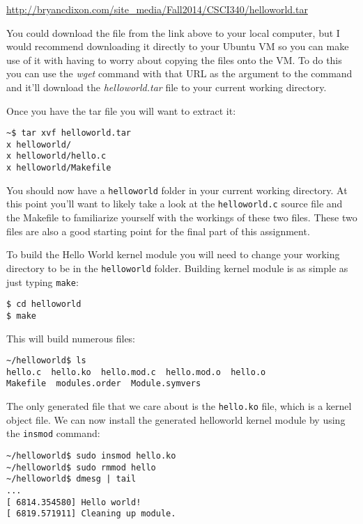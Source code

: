 \documentclass[11pt]{article}
\begin{document}
{\url{http://bryancdixon.com/site_media/Fall2014/CSCI340/helloworld.tar}}

You could download the file from the link above to your local computer, but I would recommend downloading it directly to your Ubuntu VM so you can make use of it with having to worry about copying the files onto the VM. To do this you can use the {\it wget} command with that URL as the argument to the command and it'll download the {\it helloworld.tar} file to your current working directory.

Once you have the tar file you will want to extract it:

\begin{verbatim}
~$ tar xvf helloworld.tar
x helloworld/
x helloworld/hello.c
x helloworld/Makefile
\end{verbatim}

You should now have a \texttt{helloworld} folder in your current working directory. At this point you'll want to likely take a look at the \texttt{helloworld.c} source file and the Makefile to familiarize yourself with the workings of these two files. These two files are also a good starting point for the final part of this assignment. 

To build the Hello World kernel module you will need to change your working directory to be in the \texttt{helloworld} folder. Building kernel module is as simple as just typing \texttt{make}:

\begin{verbatim}
$ cd helloworld
$ make
\end{verbatim}

\newpage

This will build numerous files:

\begin{verbatim}
~/helloworld$ ls
hello.c  hello.ko  hello.mod.c  hello.mod.o  hello.o  
Makefile  modules.order  Module.symvers
\end{verbatim}

The only generated file that we care about is the \texttt{hello.ko} file, which is a kernel object file. We can now install the generated helloworld kernel module by using the \texttt{insmod} command:

\begin{verbatim}
~/helloworld$ sudo insmod hello.ko
~/helloworld$ sudo rmmod hello
~/helloworld$ dmesg | tail
...
[ 6814.354580] Hello world!
[ 6819.571911] Cleaning up module.
\end{verbatim}
\end{document}
